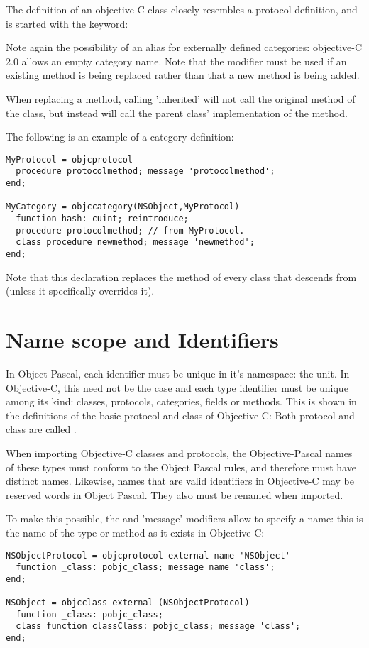 The definition of an objective-C class closely resembles a protocol
definition, and is started with the  keyword:

Note again the possibility of an alias for externally defined categories:
objective-C 2.0 allows an empty category name. Note that the
 modifier must be used if an existing method is being replaced
rather than that a new method is being added.

When replacing a method, calling 'inherited' will not call the original
method of the class, but instead will call the parent class' implementation
of the method. 

The following is an example of a category definition:
\begin{verbatim}
MyProtocol = objcprotocol
  procedure protocolmethod; message 'protocolmethod';
end;
 
MyCategory = objccategory(NSObject,MyProtocol)
  function hash: cuint; reintroduce;
  procedure protocolmethod; // from MyProtocol.
  class procedure newmethod; message 'newmethod';
end;
\end{verbatim}
Note that this declaration replaces the  method of every class
that descends from  (unless it specifically overrides it).

\section{Name scope and Identifiers}
In Object Pascal, each identifier must be unique in it's namespace: the unit. 
In Objective-C, this need not be the case and each type identifier must be
unique among its kind: classes, protocols, categories, fields or methods.
This is shown in the definitions of the basic protocol and class of
Objective-C: Both protocol and class are called .

When importing Objective-C classes and protocols, the Objective-Pascal 
names of these types must conform to the Object Pascal rules, and therefore 
must have distinct names. Likewise, names that are valid identifiers in
Objective-C may be reserved words in Object Pascal. They also must be
renamed when imported.

To make this possible, the  and 'message' modifiers allow 
to specify a name: this is the name of the type or method as it exists 
in Objective-C:
\begin{verbatim}
NSObjectProtocol = objcprotocol external name 'NSObject' 
  function _class: pobjc_class; message name 'class';
end;
 
NSObject = objcclass external (NSObjectProtocol) 
  function _class: pobjc_class; 
  class function classClass: pobjc_class; message 'class';
end;
\end{verbatim}

